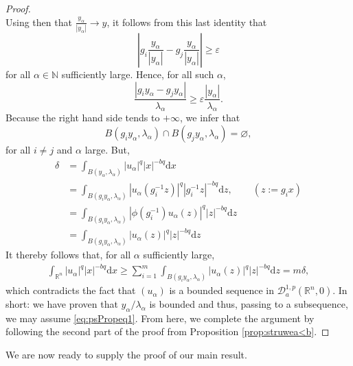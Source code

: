 \documentclass[10pt, reqno]{amsart}
\newcommand{\NN}{\mathbb{N}}
\newcommand{\RR}{\mathbb{R}}
\newcommand{\abs}[1]{\left\vert #1 \right\vert}
\newcommand{\D}{\mathcal{D}}
\renewcommand{\d}{\mathrm{d}}
\renewcommand{\epsilon}{\varepsilon}
\numberwithin{equation}{section}
\theoremstyle{definition}
\theoremstyle{remark}
\theoremstyle{plain}
\begin{document}
\begin{proof}
\[		\]
		Using then that $\frac{y_\alpha}{\abs{y_\alpha}} \to y$, it follows from this last identity that
		\begin{equation}
			\abs{g_i \frac{y_\alpha}{\abs{y_\alpha}} -g_j \frac{y_\alpha}{\abs{y_\alpha}}}  \ge \epsilon
		\end{equation}
		for all $\alpha \in \NN$ sufficiently large. Hence, for all such $\alpha$,
		\begin{equation}
			\frac{\abs{ g_i y_\alpha - g_j y_\alpha }}{\lambda_\alpha} \ge \epsilon \frac{\abs{y_\alpha}}{\lambda_\alpha}.
		\end{equation}
		Because the right hand side tends to $+\infty$, we infer that $$B(g_i y_\alpha, \lambda_\alpha) \cap B(g_j y_\alpha, \lambda_\alpha)=\varnothing,$$ for all $i \ne j$ and $\alpha$ large. But,
		\begin{align*}
			\delta &= \int_{B(y_\alpha,\lambda_\alpha)} \abs{u_\alpha}^q\abs{x}^{-bq}\d{x}\\
			&=  \int_{B(g_i y_\alpha,\lambda_\alpha)} \abs{u_\alpha(g_i^{-1} z)}^q\abs{g_i^{-1} z}^{-bq}\d{z}, && (z := g_i x)\\
			&= \int_{B(g_i y_\alpha,\lambda_\alpha)} \abs{\phi(g_i^{-1})u_\alpha(z)}^q\abs{z}^{-bq}\d{z}\\
			&=	\int_{B(g_i y_\alpha,\lambda_\alpha)} \abs{u_\alpha(z)}^q\abs{z}^{-bq}\d{z}
		\end{align*}
		It thereby follows that, for all $\alpha$ sufficiently large,
		\begin{align*}
			\int_{\RR^n} \abs{u_\alpha}^q\abs{x}^{-bq}\d{x} \ge \sum_{i=1}^m \int_{B(g_i y_\alpha,\lambda_\alpha)} \abs{u_\alpha(z)}^q\abs{z}^{-bq}\d{z} = m\delta,
		\end{align*}
		which contradicts the fact that $(u_\alpha)$ is a bounded sequence in $\D_a^{1,p}(\RR^n,0)$. In short: we have proven that $y_\alpha/\lambda_\alpha$ is bounded and thus, passing to a subsequence, we may assume \eqref{eq:psPropeq1}. From here, we complete the argument by following the second part of the proof from Proposition \ref{prop:struwea<b}.
	\end{proof}
	
	
	We are now ready to supply the proof of our main result. 
	
\end{document}
